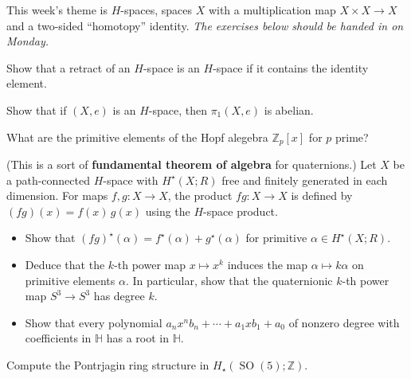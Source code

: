 \documentclass[12pt]{pset}
\author{Jim Fowler}
\date{Spring 2012}
\newcommand{\Z}{\mathbb{Z}}
\DeclareMathOperator{\SO}{SO}
\begin{document}
\maketitle

This week's theme is $H$-spaces, spaces $X$ with a multiplication map
$X \times X \to X$ and a two-sided ``homotopy'' identity.  \textit{The
  exercises below should be handed in on Monday.}

\begin{problem}
Show that a retract of an $H$-space is an $H$-space if it contains the identity element.
\end{problem}

\begin{problem}
Show that if $(X,e)$ is an $H$-space, then $\pi_1(X,e)$ is abelian.
\end{problem}

\begin{problem}
What are the primitive elements of the Hopf alegebra $\Z_p[x]$ for $p$ prime?
\end{problem}

\begin{problem}
  (This is a sort of \textbf{fundamental theorem of algebra} for
  quaternions.)  Let $X$ be a path-connected $H$-space with
  $H^\star(X;R)$ free and finitely generated in each dimension.  For
  maps $f, g : X \to X$, the product $fg : X \to X$ is defined by
  $(fg)(x) = f(x)\, g(x)$ using the $H$-space product.
\begin{itemize}
\item Show that $(fg)^\star(\alpha) = f^\star(\alpha) + g^\star(\alpha)$ for primitive $\alpha \in H^\star(X;R)$.
\item Deduce that the $k$-th power map $x \mapsto x^k$ induces the map $\alpha \mapsto k\alpha$ on primitive elements $\alpha$.  In particular, show that the quaternionic $k$-th power map $S^3 \to S^3$ has degree $k$.
\item Show that every polynomial $a_n x^n b_n + \cdots + a_1 x b_1 + a_0$ of nonzero degree with coefficients in $\mathbb{H}$ has a root in $\mathbb{H}$.
\end{itemize}
\end{problem}

\begin{problem}
Compute the Pontrjagin ring structure in $H_\star(\SO(5);\Z)$.
\end{problem}

\pagebreak
\null
\end{document}
